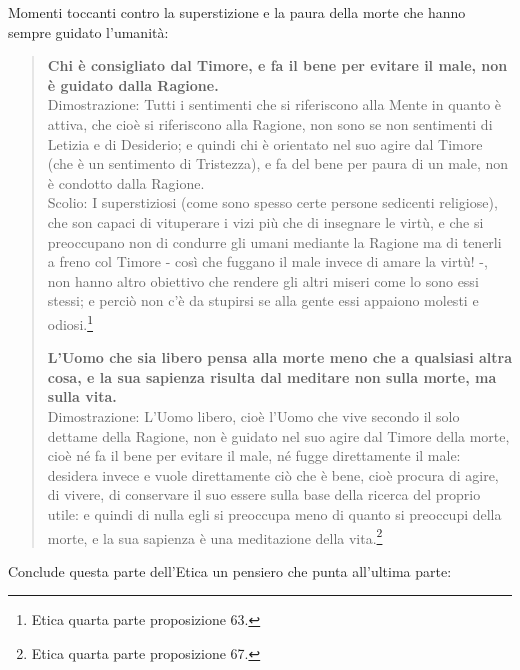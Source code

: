 Momenti toccanti contro la superstizione e la paura della morte che hanno sempre guidato l'umanità:

\begin{quotation}
	\small \textbf{Chi è consigliato dal Timore, e fa il bene per evitare il male, non è guidato dalla Ragione.}\\
	Dimostrazione: Tutti i sentimenti che si riferiscono alla Mente in quanto è attiva, che
	cioè si riferiscono alla Ragione, non sono se non sentimenti di Letizia e di Desiderio; e quindi chi è orientato nel suo agire dal Timore (che è un sentimento di Tristezza), e fa del bene
	per paura di un male, non è condotto dalla Ragione.\\
	Scolio: I superstiziosi (come sono spesso certe persone sedicenti religiose), che
	son capaci di vituperare i vizi più che di insegnare le virtù, e che si preoccupano non di condurre gli umani mediante la Ragione ma di tenerli a freno col Timore - così che fuggano il
	male invece di amare la virtù! -, non hanno altro obiettivo che rendere gli altri miseri come
	lo sono essi stessi; e perciò non c’è da stupirsi se alla gente essi appaiono molesti e odiosi.\footnote{Etica quarta parte proposizione 63.}
	
\textbf{	L’Uomo che sia libero pensa alla morte meno che a qualsiasi altra cosa, e la sua sapienza
	risulta dal meditare non sulla morte, ma sulla vita.}\\
	Dimostrazione: L’Uomo libero, cioè l’Uomo che vive secondo il solo dettame della Ragione, non è guidato nel suo agire dal Timore della morte, cioè né fa il bene per evitare il male,
	né fugge direttamente il male: desidera invece e vuole direttamente ciò che è bene, cioè
	procura di agire, di vivere, di conservare il suo essere sulla base della ricerca del proprio
	utile: e quindi di nulla egli si preoccupa meno di quanto si preoccupi della
	morte, e la sua sapienza è una meditazione della vita.\footnote{Etica quarta parte proposizione 67.}
\end{quotation}

Conclude questa parte dell'Etica un pensiero che punta all'ultima parte:

